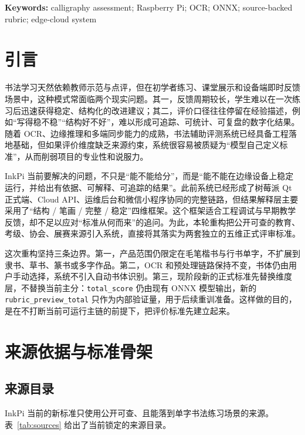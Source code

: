 \documentclass[UTF8,a4paper,12pt,fontset=none]{ctexart}
\begin{document}
\noindent\textbf{Keywords:} calligraphy assessment; Raspberry Pi; OCR; ONNX; source-backed rubric; edge-cloud system

\section{引言}
书法学习天然依赖教师示范与点评，但在初学者练习、课堂展示和设备端即时反馈场景中，这种模式常面临两个现实问题。其一，反馈周期较长，学生难以在一次练习后迅速获得稳定、结构化的改进建议；其二，评价口径往往停留在经验描述，例如“写得稳不稳”“结构好不好”，难以形成可追踪、可统计、可复盘的数字化结果。随着 OCR、边缘推理和多端同步能力的成熟，书法辅助评测系统已经具备工程落地基础，但如果评价维度缺乏来源约束，系统很容易被质疑为“模型自己定义标准”，从而削弱项目的专业性和说服力。

InkPi 当前要解决的问题，不只是“能不能给分”，而是“能不能在边缘设备上稳定运行，并给出有依据、可解释、可追踪的结果”。此前系统已经形成了树莓派 Qt 正式端、Cloud API、运维后台和微信小程序协同的完整链路，但结果解释层主要采用了“结构 / 笔画 / 完整 / 稳定”四维框架。这个框架适合工程调试与早期教学反馈，却不足以应对“标准从何而来”的追问。为此，本轮重构把公开可查的教育、考级、协会、展赛来源引入系统，直接将其落实为两套独立的五维正式评审标准。

这次重构坚持三条边界。第一，产品范围仍限定在毛笔楷书与行书单字，不扩展到隶书、草书、篆书或多字作品。第二，OCR 和预处理链路保持不变，书体仍由用户手动选择，系统不引入自动书体识别。第三，现阶段新的正式标准先替换维度层，不替换当前主分：\texttt{total\_score} 仍由现有 ONNX 模型输出，新的 \texttt{rubric\_preview\_total} 只作为内部验证量，用于后续重训准备。这样做的目的，是在不打断当前可运行主链的前提下，把评价标准先建立起来。

\section{来源依据与标准骨架}
\subsection{来源目录}
InkPi 当前的新标准只使用公开可查、且能落到单字书法练习场景的来源。表~\ref{tab:sources} 给出了当前锁定的来源目录。
\end{document}
